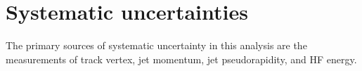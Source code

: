 
\chapter{Systematic uncertainties}

The primary sources of systematic uncertainty in this analysis are the measurements of track vertex, jet momentum, jet pseudorapidity, and HF energy. 